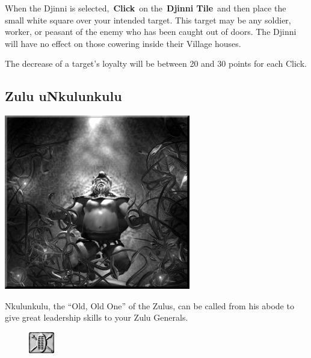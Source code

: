 When the Djinni is selected, \textbf{Click} on the \textbf{Djinni Tile} and then place the small white square over your intended target. This target may be any soldier, worker, or peasant of the enemy who has been caught out of doors. The Djinni will have no effect on those cowering inside their Village houses.

The decrease of a target's loyalty will be between 20 and 30 points for each Click.

\subsection{Zulu uNkulunkulu}


\begin{center}
	\includegraphics[width=.9\linewidth]{Aoldone}
\end{center}

Nkulunkulu, the “Old, Old One” of the Zulus, can be called from his abode to give great leadership skills to your Zulu Generals.

\begin{figure}
	\vspace{-20pt}
	\begin{center}
		\includegraphics[width=0.1\textwidth]{Toldone}
	\end{center}
	\vspace{-20pt}
\end{figure}

